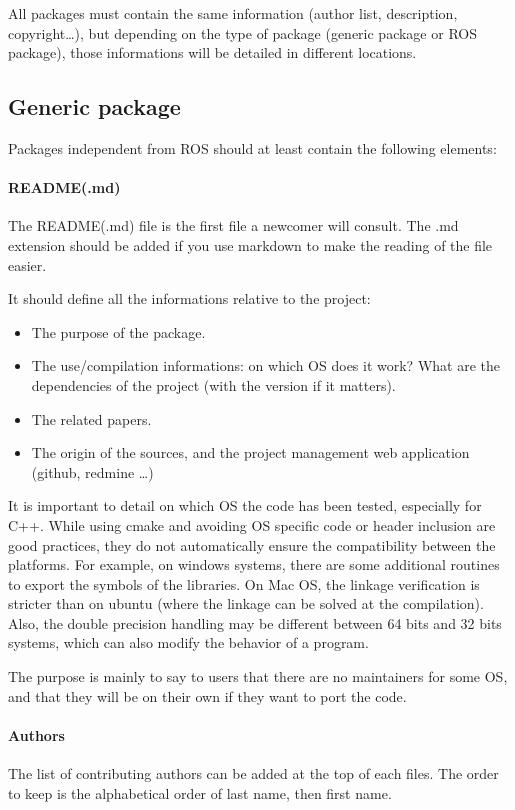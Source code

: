 All packages must contain the same information (author list, description, copyright\ldots), but depending on the type of package 
(generic package or ROS package), those informations will be detailed in different locations.


\subsection{Generic package}
Packages independent from ROS should at least contain the following elements:

\paragraph{README(.md)}
The README(.md) file is the first file a newcomer will consult. 
The .md extension should be added if you use markdown to make the reading of the file easier.

It should define all the informations relative to the project:
\begin{itemize}[noitemsep,topsep=0pt,parsep=0pt,partopsep=0pt]
\item The purpose of the package.
\item The use/compilation informations: on which OS does it work? What are the dependencies of the project (with the version if it matters).
\item The related papers.
\item The origin of the sources, and the project management web application (github, redmine \ldots) 
\end{itemize}

It is important to detail on which OS the code has been tested, especially for C++.
While using cmake and avoiding OS specific code or header inclusion are good practices, 
they do not automatically ensure the compatibility between the platforms. 
For example, on windows systems, there are some additional routines to export the symbols of the libraries.
On Mac OS, the linkage verification is stricter than on ubuntu (where the linkage can be solved at the compilation).
Also, the double precision handling may be different between 64 bits and 32 bits systems, which can also modify the behavior of a program.

The purpose is mainly to say to users that there are no maintainers for some OS, and that they will be on their own if they want to port the code.

\paragraph{Authors}
The list of contributing authors can be added at the top of each files.
The order to keep is the alphabetical order of last name, then first name.

